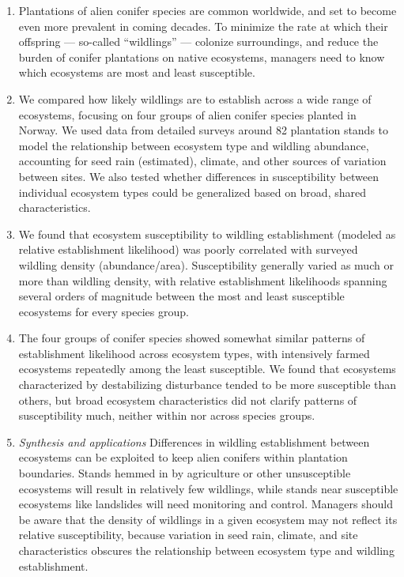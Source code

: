 \documentclass[
]{article}
\providecommand{\tightlist}{%
  \setlength{\itemsep}{0pt}\setlength{\parskip}{0pt}}
\begin{document}
\begin{enumerate}
\def\labelenumi{\arabic{enumi}.}
\tightlist
\item
  Plantations of alien conifer species are common worldwide, and set to become even more prevalent in coming decades. To minimize the rate at which their offspring --- so-called ``wildlings'' --- colonize surroundings, and reduce the burden of conifer plantations on native ecosystems, managers need to know which ecosystems are most and least susceptible.
\item
  We compared how likely wildlings are to establish across a wide range of ecosystems, focusing on four groups of alien conifer species planted in Norway. We used data from detailed surveys around 82 plantation stands to model the relationship between ecosystem type and wildling abundance, accounting for seed rain (estimated), climate, and other sources of variation between sites. We also tested whether differences in susceptibility between individual ecosystem types could be generalized based on broad, shared characteristics.
\item
  We found that ecosystem susceptibility to wildling establishment (modeled as relative establishment likelihood) was poorly correlated with surveyed wildling density (abundance/area). Susceptibility generally varied as much or more than wildling density, with relative establishment likelihoods spanning several orders of magnitude between the most and least susceptible ecosystems for every species group.
\item
  The four groups of conifer species showed somewhat similar patterns of establishment likelihood across ecosystem types, with intensively farmed ecosystems repeatedly among the least susceptible. We found that ecosystems characterized by destabilizing disturbance tended to be more susceptible than others, but broad ecosystem characteristics did not clarify patterns of susceptibility much, neither within nor across species groups.
\item
  \emph{Synthesis and applications} Differences in wildling establishment between ecosystems can be exploited to keep alien conifers within plantation boundaries. Stands hemmed in by agriculture or other unsusceptible ecosystems will result in relatively few wildlings, while stands near susceptible ecosystems like landslides will need monitoring and control. Managers should be aware that the density of wildlings in a given ecosystem may not reflect its relative susceptibility, because variation in seed rain, climate, and site characteristics obscures the relationship between ecosystem type and wildling establishment.
\end{enumerate}
\end{document}
